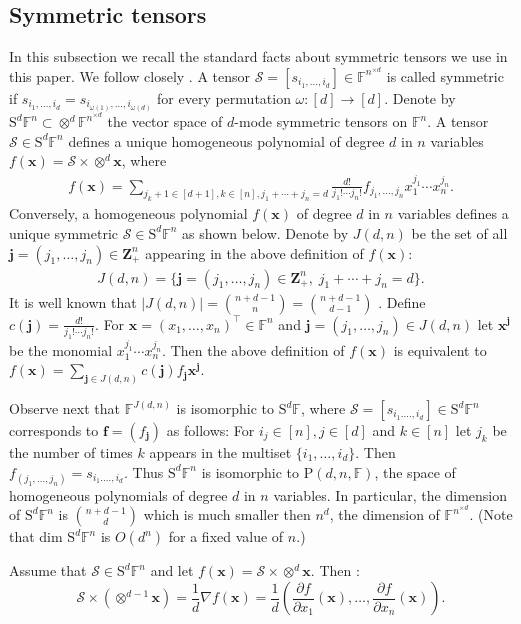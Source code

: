 \documentclass{amsart}
\newcommand{\F}{\mathbb{F}}
\newcommand{\Z}{\mathbf{Z}}
\newcommand{\f}{\mathbf{f}}
\newcommand{\x}{\mathbf{x}}
\newcommand{\0}{\mathbf{0}}
\newcommand{\1}{\mathbf{1}}
\newcommand{\bj}{\mathbf{j}}
\newcommand{\cS}{\mathcal{S}}
\newcommand{\trans}{^\top}
\newcommand{\rP}{\mathrm{P}}
\newcommand{\rS}{\mathrm{S}}
\theoremstyle{remark}
\numberwithin{equation}{section} %
\begin{document}
\subsection{Symmetric tensors}\label{subsec:symten}
 In this subsection we recall the standard facts about symmetric tensors we use in this paper.  We follow closely \cite{FW16}.  A tensor $\cS=[s_{i_1,\ldots,i_d}]\in\F^{n^{\times d}}$ is called symmetric  if $s_{i_1,\ldots,i_d}=
s_{i_{\omega(1)},\ldots,i_{\omega(d)}}$ for every permutation $\omega:[d]\to[d]$.  
Denote by $\rS^d\F^n\subset \otimes^d\F^{n^{\times d}}$ the vector space of $d$-mode symmetric tensors on $\F^n$.  A tensor
$\cS\in\rS^d\F^n$ defines a unique homogeneous polynomial of degree $d$ in $n$ variables $f(\x)=\cS\times\otimes^d\x$, where
\begin{eqnarray*}\label{defpolfx}
f(\x)=\sum_{ j_k+1\in [d+1],k\in[n], j_1+\cdots +j_n=d} \frac{d!}{j_1!\cdots j_n!} f_{j_1,\ldots,j_n} x_1^{j_1}\cdots x_n^{j_n}.
\end{eqnarray*}
Conversely, a homogeneous polynomial $f(\x)$ of degree $d$ in $n$ variables defines a unique symmetric $\cS\in\rS^d\F^n$ as shown below.
 Denote by $J(d,n)$ be the set of all $\bj=(j_1,\ldots,j_n)\in\Z_+^n$ appearing in the above definition of $f(\x)$:
\begin{eqnarray*}\label{defJdn} 
J(d,n)= \{\bj=(j_1,\ldots,j_n)\in\Z_+^n,\; j_1+\cdots+j_n=d\}.
\end{eqnarray*}
It is well known that $|J(d,n)|={n+d-1\choose n}={n+d-1\choose d-1}$ \cite{FW16}.
Define $c(\bj)=\frac{d!}{j_1!\cdots j_n!}$.
For $\x=(x_1,\ldots,x_n)\trans\in\F^n$ and $\bj=(j_1,\ldots,j_n)\in J(d,n)$ let $\x^{\bj}$ be the monomial $x_1^{j_1}\cdots x_n^{j_n}$.  Then the above definition of $f(\x)$  is equivalent to $f(\x)=\sum_{\bj\in J(d,n)} c(\bj)f_{\bj}\x^{\bj}$.

Observe next that $\F^{J(d,n)}$ is isomorphic to $\rS^d\F$, where $\cS=[s_{i_1.\ldots,i_d}]\in \rS^d\F^n$ corresponds to $\f=(f_{\bj})$ as follows:  For $i_j\in[n],j\in [d]$ and $k\in[n]$ let $j_k$ be the number of times $k$ appears in the multiset $\{i_1,\ldots,i_d\}$.  Then $f_{(j_1,\ldots,j_n)}=s_{i_1.\ldots,i_d}$.  Thus $\rS^d\F^n$ is isomorphic to $\rP(d,n,\F)$, the space of homogeneous  polynomials of degree $d$ in $n$ variables.  In particular, the dimension of $\rS^d\F^n$ is $n+d-1\choose d$ which is much smaller then $n^d$, the dimension of $\F^{n^{\times d}}$.  (Note that dim $\rS^d\F^n$ is $O(d^n)$ for a fixed value of $n$.)  

Assume that $\cS\in\rS^d\F^n$ and let $f(\x)=\cS\times\otimes^d\x$.  Then \cite{FW16}:
\[\cS\times(\otimes^{d-1}\x)=\frac{1}{d}\nabla f(\x)=\frac{1}{d}(\frac{\partial f}{\partial x_1}(\x),\ldots,\frac{\partial f}{\partial x_n}(\x)).\]
\end{document}
